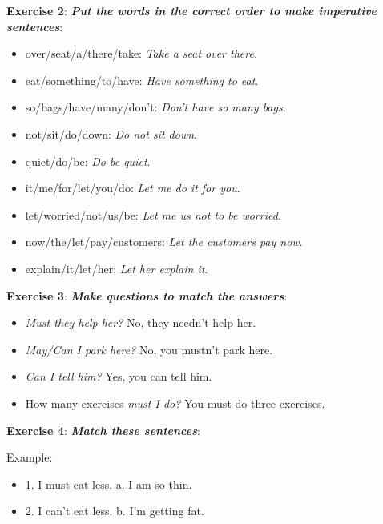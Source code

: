 \textbf{Exercise 2}: \textit{\textbf{Put the words in the correct order to make imperative sentences}}:

\begin{itemize}

\item over/seat/a/there/take: \textit{Take a seat over there}.
\item eat/something/to/have: \textit{Have something to eat}.
\item so/bags/have/many/don't: \textit{Don't have so many bags}.
\item not/sit/do/down: \textit{Do not sit down}.
\item quiet/do/be: \textit{Do be quiet}.
\item it/me/for/let/you/do: \textit{Let me do it for you}.
\item let/worried/not/us/be: \textit{Let me us not to be worried}.
\item now/the/let/pay/customers: \textit{Let the customers pay now}.
\item explain/it/let/her: \textit{Let her explain it}.

\end{itemize}

\textbf{Exercise 3}: \textit{\textbf{Make questions to match the answers}}:

\begin{itemize}

\item \textit{Must they help her?} No, they needn't help her.
\item \textit{May/Can I park here?} No, you mustn't park here.
\item \textit{Can I tell him?} Yes, you can tell him.
\item How many exercises \textit{must I do?} You must do three exercises.

\end{itemize}

\textbf{Exercise 4}: \textit{\textbf{Match these sentences}}:

Example:
\begin{itemize}
\item 1. I must eat less. a. I am so thin.
\item 2. I can't eat less. b. I'm getting fat.
\end{itemize}

